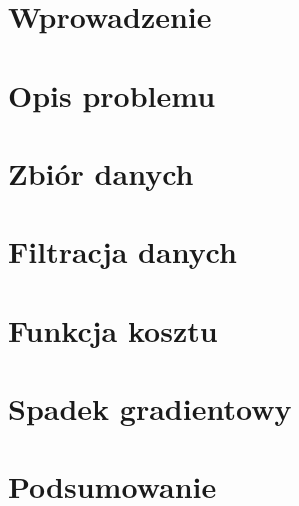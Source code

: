 \documentclass{article}
\begin{document}
\maketitle

\tableofcontents
\newpage
\section{Wprowadzenie}
\vspace*{0.5cm}
	

\newpage
\section{Opis problemu}
\vspace*{0.5cm}
	

\newpage
\section{Zbiór danych}
\vspace*{0.5cm}
	

\newpage
\section{Filtracja danych}
	

\newpage
\section{Funkcja kosztu}
	

\newpage
\section{Spadek gradientowy}
	

\newpage
\section{Podsumowanie}
	
\end{document}
